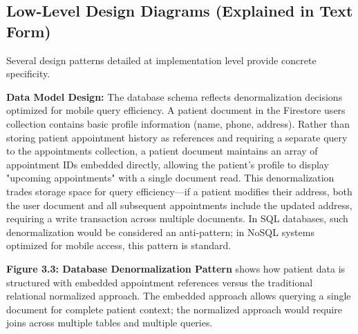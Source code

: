 \documentclass[12pt,a4paper]{report}
\begin{document}
\subsection{Low-Level Design Diagrams (Explained in Text Form)}

Several design patterns detailed at implementation level provide concrete specificity.

\textbf{Data Model Design:} The database schema reflects denormalization decisions optimized for mobile query efficiency. A patient document in the Firestore users collection contains basic profile information (name, phone, address). Rather than storing patient appointment history as references and requiring a separate query to the appointments collection, a patient document maintains an array of appointment IDs embedded directly, allowing the patient's profile to display "upcoming appointments" with a single document read. This denormalization trades storage space for query efficiency—if a patient modifies their address, both the user document and all subsequent appointments include the updated address, requiring a write transaction across multiple documents. In SQL databases, such denormalization would be considered an anti-pattern; in NoSQL systems optimized for mobile access, this pattern is standard.

\textbf{Figure 3.3: Database Denormalization Pattern} shows how patient data is structured with embedded appointment references versus the traditional relational normalized approach. The embedded approach allows querying a single document for complete patient context; the normalized approach would require joins across multiple tables and multiple queries.
\end{document}
